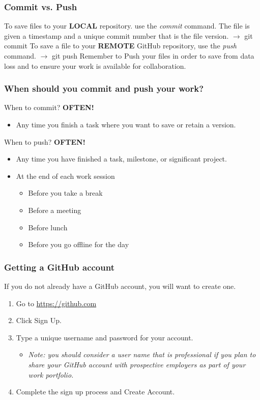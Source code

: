 \documentclass{beamer}
\begin{document}
\begin{frame}\frametitle{Commit vs. Push}
To save files to your  \textbf{LOCAL} repository. use the \emph{commit} command. The file is given a timestamp and a unique commit number that is the file version.\newline\newline
$\rightarrow$ git commit\newline\newline
To save a file to your \textbf{REMOTE} GitHub repository, use the \emph{push} command.\newline\newline
$\rightarrow$ git push\newline\newline
\color{red}
Remember to Push your files
\color{black}
in order to save from data loss and to ensure your work is available for collaboration.
\end{frame}

\begin{frame}\frametitle{When should you commit and push your work?}
When to commit? \color{red}\textbf{OFTEN!}\color{black}
\begin{itemize}
\item Any time you finish a task where you want to save or retain a version.
\end{itemize}
\vspace{1cm}
When to push? \color{red}\textbf{OFTEN!}\color{black}
\begin{itemize}
\item Any time you have finished a task, milestone, or significant project.
\item At the end of each work session
\begin{itemize}
\item Before you take a break
\item Before a meeting
\item Before lunch
\item Before you go offline for the day
\end{itemize}
\end{itemize}
\end{frame}

\begin{frame}\frametitle{Getting a GitHub account}
If you do not already have a GitHub account, you will want to create one. 
\vspace{1cm}
\begin{enumerate}
\item Go to \url{https://github.com}
\item Click Sign Up.
\item Type a unique username and password for your account. 
\begin{itemize}
\item \emph{Note: you should consider a user name that is professional if you plan to share your GitHub account with prospective employers as part of your work portfolio.}
\end{itemize}
\item Complete the sign up process and Create Account.
\end{enumerate}
\end{frame}
\end{document}
